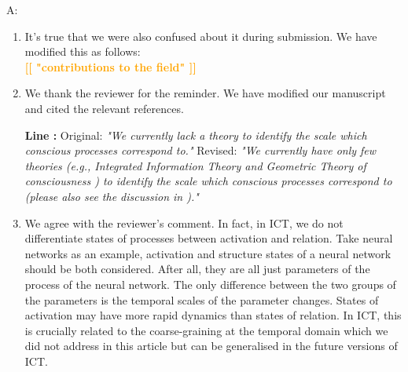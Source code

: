 \documentclass[utf8]{article}
\newenvironment{ans}  
    {\color{Black}\noindent A:}
    {~\newline}
\newcommand{\revise}[3]{
	\newline
	\newline
    \noindent
    \textbf{Line #1:}
    \newline
    Original:\newline
    \textit{"#2"}
    \newline
    \newline
    Revised:\newline
    \textit{"#3"}\newline}
\newcommand{\toWrite}[1]{\noindent
	\textcolor{Orange}{\textbf{[[ #1 ]]}}}
\begin{document}
    	\begin{ans}
    		\begin{enumerate}
    			\item It's true that we were also confused about it during submission. 
    			We have modified this as follows: \\
    			\toWrite{"contributions to the field"}
    			
    			\item We thank the reviewer for the reminder. We have modified our manuscript and cited the relevant references. 
    			\revise{}
    			{We currently lack a theory to identify the scale which conscious processes correspond to.}
    			{We currently have only few theories (e.g., Integrated Information Theory \citep{hoel2016can} and Geometric Theory of consciousness \citep{fekete2011towards,fekete2012lack}) to identify the scale which conscious processes correspond to (please also see the discussion in \cite{fekete2016system}).}    			
    			
    			\item We agree with the reviewer's comment. 
    			In fact, in ICT, we do not differentiate states of processes between activation and relation. Take neural networks as an example, activation and structure states of a neural network should be both considered. After all, they are all just parameters of the process of the neural network. The only difference between the two groups of the parameters is the temporal scales of the parameter changes. States of activation may have more rapid dynamics than states of relation. In ICT, this is crucially related to the coarse-graining at the temporal domain which we did not address in this article but can be generalised in the future versions of ICT. 
    			
    			
    			
    		\end{enumerate}
    		
    	\end{ans}
        
        
\end{document}
